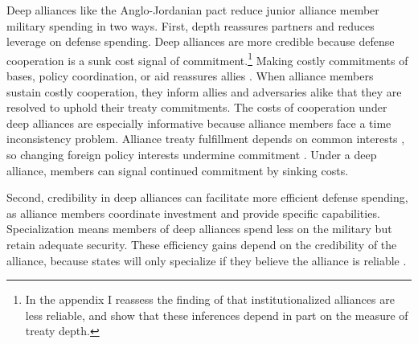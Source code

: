 \documentclass[12pt]{article}
\begin{document}
Deep alliances like the Anglo-Jordanian pact reduce junior alliance member military spending in two ways. 
First, depth reassures partners and reduces leverage on defense spending.  
Deep alliances are more credible because defense cooperation is a sunk cost signal of commitment.\footnote{In the appendix I reassess the finding of \citet{LeedsAnac2005} that institutionalized alliances are less reliable, and show that these inferences depend in part on the measure of treaty depth.}
Making costly commitments of bases, policy coordination, or aid reassures allies \citep{Morrow1994}. 
When alliance members sustain costly cooperation, they inform allies and adversaries alike that they are resolved to uphold their treaty commitments. 
The costs of cooperation under deep alliances are especially informative because alliance members face a time inconsistency problem. 
Alliance treaty fulfillment depends on common interests \citep{Morrow2000, Leeds2003a}, so changing foreign policy interests undermine commitment \citep{LeedsSavun2007}. 
Under a deep alliance, members can signal continued commitment by sinking costs.  


Second, credibility in deep alliances can facilitate more efficient defense spending, as alliance members coordinate investment and provide specific capabilities. 
Specialization means members of deep alliances spend less on the military but retain adequate security.
These efficiency gains depend on the credibility of the alliance, because states will only specialize if they believe the alliance is reliable \citep{Leeds2003a}.  
\end{document}
